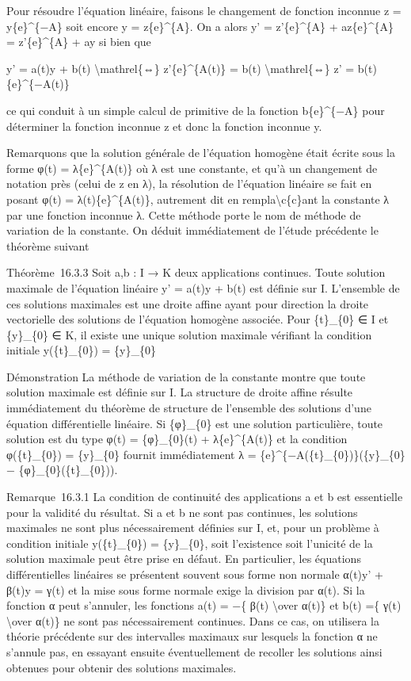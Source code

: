 \documentclass[]{article}
\begin{document}
Pour résoudre l'équation linéaire, faisons le changement de fonction
inconnue z = y\{e\}\^{}\{−A\} soit encore y = z\{e\}\^{}\{A\}. On a
alors y' = z'\{e\}\^{}\{A\} + az\{e\}\^{}\{A\} = z'\{e\}\^{}\{A\} + ay
si bien que

y' = a(t)y + b(t) \textbackslash{}mathrel\{⇔\} z'\{e\}\^{}\{A(t)\} =
b(t) \textbackslash{}mathrel\{⇔\} z' = b(t)\{e\}\^{}\{−A(t)\}

ce qui conduit à un simple calcul de primitive de la fonction
b\{e\}\^{}\{−A\} pour déterminer la fonction inconnue z et donc la
fonction inconnue y.

Remarquons que la solution générale de l'équation homogène était écrite
sous la forme φ(t) = λ\{e\}\^{}\{A(t)\} où λ est une constante, et qu'à
un changement de notation près (celui de z en λ), la résolution de
l'équation linéaire se fait en posant φ(t) = λ(t)\{e\}\^{}\{A(t)\},
autrement dit en rempla\textbackslash{}c\{c\}ant la constante λ par une
fonction inconnue λ. Cette méthode porte le nom de méthode de variation
de la constante. On déduit immédiatement de l'étude précédente le
théorème suivant

Théorème~16.3.3 Soit a,b : I → K deux applications continues. Toute
solution maximale de l'équation linéaire y' = a(t)y + b(t) est définie
sur I. L'ensemble de ces solutions maximales est une droite affine ayant
pour direction la droite vectorielle des solutions de l'équation
homogène associée. Pour \{t\}\_\{0\} ∈ I et \{y\}\_\{0\} ∈ K, il existe
une unique solution maximale vérifiant la condition initiale
y(\{t\}\_\{0\}) = \{y\}\_\{0\}

Démonstration La méthode de variation de la constante montre que toute
solution maximale est définie sur I. La structure de droite affine
résulte immédiatement du théorème de structure de l'ensemble des
solutions d'une équation différentielle linéaire. Si \{φ\}\_\{0\} est
une solution particulière, toute solution est du type φ(t) =
\{φ\}\_\{0\}(t) + λ\{e\}\^{}\{A(t)\} et la condition φ(\{t\}\_\{0\}) =
\{y\}\_\{0\} fournit immédiatement λ =
\{e\}\^{}\{−A(\{t\}\_\{0\})\}(\{y\}\_\{0\} −
\{φ\}\_\{0\}(\{t\}\_\{0\})).

Remarque~16.3.1 La condition de continuité des applications a et b est
essentielle pour la validité du résultat. Si a et b ne sont pas
continues, les solutions maximales ne sont plus nécessairement définies
sur I, et, pour un problème à condition initiale y(\{t\}\_\{0\}) =
\{y\}\_\{0\}, soit l'existence soit l'unicité de la solution maximale
peut être prise en défaut. En particulier, les équations différentielles
linéaires se présentent souvent sous forme non normale α(t)y' + β(t)y =
γ(t) et la mise sous forme normale exige la division par α(t). Si la
fonction α peut s'annuler, les fonctions a(t) = −\{ β(t)
\textbackslash{}over α(t)\} et b(t) =\{ γ(t) \textbackslash{}over α(t)\}
ne sont pas nécessairement continues. Dans ce cas, on utilisera la
théorie précédente sur des intervalles maximaux sur lesquels la fonction
α ne s'annule pas, en essayant ensuite éventuellement de recoller les
solutions ainsi obtenues pour obtenir des solutions maximales.
\end{document}
